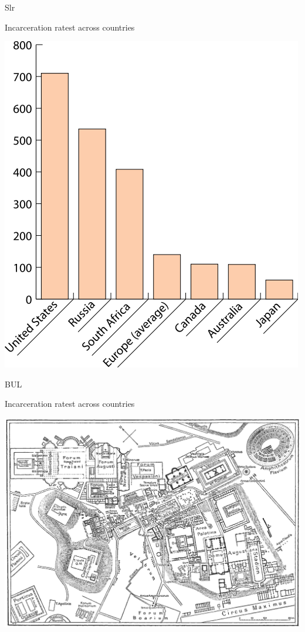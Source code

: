 \begin{chart}{S}{lr}
\caption{Incarceration ratest across countries}
\label{chart:incarceration}
\includegraphics[width=\chartwidth,height=\chartheight]{incarceration}  
\end{chart}

\begin{map}{B}{UL}
\caption{Incarceration ratest across countries}
\label{chart:incarceration}
\includegraphics[width=\chartwidth,height=\chartheight]{Rome}  
\end{map}

